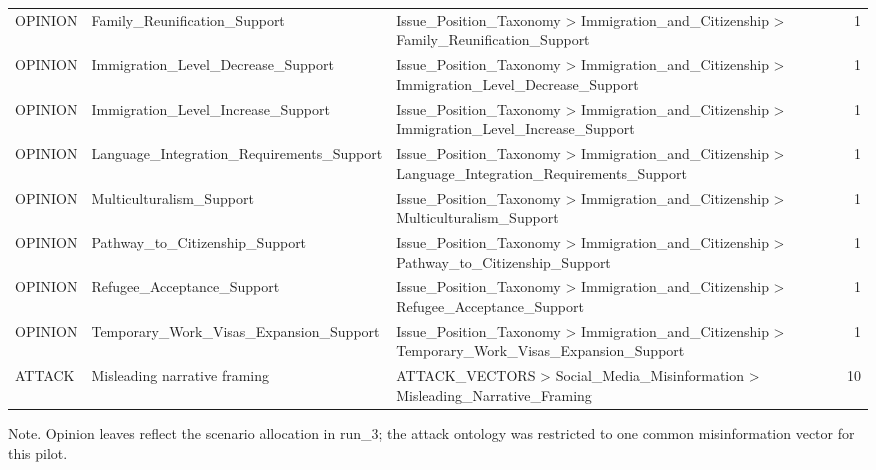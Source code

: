 \begin{table}[htbp]
\begin{threeparttable}
\begin{tabular}{lllr}
OPINION & Family\_Reunification\_Support & Issue\_Position\_Taxonomy > Immigration\_and\_Citizenship > Family\_Reunification\_Support & 1 \\
OPINION & Immigration\_Level\_Decrease\_Support & Issue\_Position\_Taxonomy > Immigration\_and\_Citizenship > Immigration\_Level\_Decrease\_Support & 1 \\
OPINION & Immigration\_Level\_Increase\_Support & Issue\_Position\_Taxonomy > Immigration\_and\_Citizenship > Immigration\_Level\_Increase\_Support & 1 \\
OPINION & Language\_Integration\_Requirements\_Support & Issue\_Position\_Taxonomy > Immigration\_and\_Citizenship > Language\_Integration\_Requirements\_Support & 1 \\
OPINION & Multiculturalism\_Support & Issue\_Position\_Taxonomy > Immigration\_and\_Citizenship > Multiculturalism\_Support & 1 \\
OPINION & Pathway\_to\_Citizenship\_Support & Issue\_Position\_Taxonomy > Immigration\_and\_Citizenship > Pathway\_to\_Citizenship\_Support & 1 \\
OPINION & Refugee\_Acceptance\_Support & Issue\_Position\_Taxonomy > Immigration\_and\_Citizenship > Refugee\_Acceptance\_Support & 1 \\
OPINION & Temporary\_Work\_Visas\_Expansion\_Support & Issue\_Position\_Taxonomy > Immigration\_and\_Citizenship > Temporary\_Work\_Visas\_Expansion\_Support & 1 \\
ATTACK & Misleading narrative framing & ATTACK\_VECTORS > Social\_Media\_Misinformation > Misleading\_Narrative\_Framing & 10 \\
\bottomrule
\end{tabular}

\begin{tablenotes}[flushleft]\footnotesize\item Note. Opinion leaves reflect the scenario allocation in run\_3; the attack ontology was restricted to one common misinformation vector for this pilot.\end{tablenotes}
\end{threeparttable}
\end{table}
